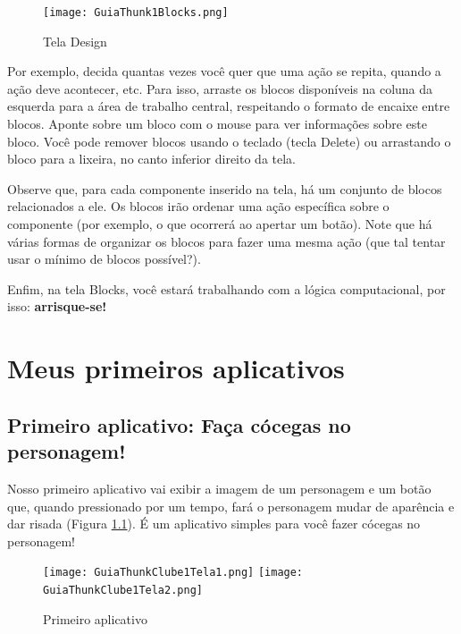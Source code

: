 \documentclass[11pt,fleqn]{book} %
\begin{document}
\begin{figure}[H]
    \centering
    \texttt{[image: GuiaThunk1Blocks.png]}
    \caption{Tela Design}\label{fig:telablocks}
\end{figure}

Por exemplo, decida quantas vezes você quer que uma ação se repita, quando a ação deve acontecer, etc. Para isso, arraste os blocos disponíveis na coluna da esquerda para a área de trabalho central, respeitando o formato de encaixe entre blocos. Aponte sobre um bloco com o mouse para ver informações sobre este bloco. Você pode remover blocos usando o teclado (tecla Delete) ou arrastando o bloco para a lixeira, no canto inferior direito da tela.

Observe que, para cada componente inserido na tela, há um conjunto de blocos relacionados a ele. Os blocos irão ordenar uma ação específica sobre o componente (por exemplo, o que ocorrerá ao apertar um botão). Note que há várias formas de organizar os blocos para fazer uma mesma ação (que tal tentar usar o mínimo de blocos possível?).

Enfim, na tela Blocks, você estará trabalhando com a lógica computacional, por isso: \textbf{arrisque-se!}


\chapter{Meus primeiros aplicativos}

\section{Primeiro aplicativo: Faça cócegas no personagem!}

Nosso primeiro aplicativo vai exibir a imagem de um personagem e um botão que, quando pressionado por um tempo, fará o personagem mudar de aparência e dar risada (Figura \ref{fig:primeiroapp}). É um aplicativo simples para você fazer cócegas no personagem!


\begin{figure}[H]
	\centering

    \texttt{[image: GuiaThunkClube1Tela1.png]}\hspace{0.2cm}
    \texttt{[image: GuiaThunkClube1Tela2.png]}
	\caption{Primeiro aplicativo}\label{fig:primeiroapp}
\end{figure}
\end{document}
